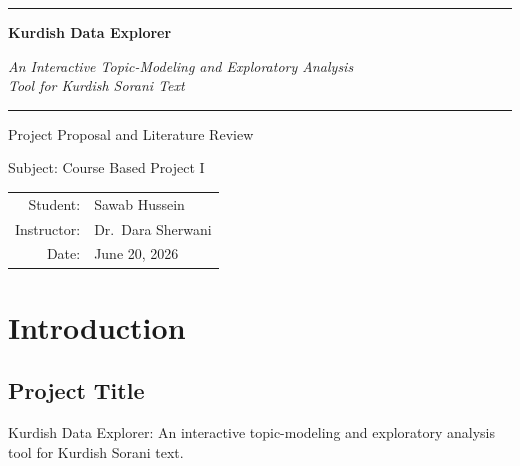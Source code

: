 \documentclass[12pt,a4paper]{article}
\begin{document}
\thispagestyle{empty}
\begingroup
\centering
{}

{\color{Accent}\rule{0.55\textwidth}{0.7pt}}\par
\vspace{1.1em}
{\fontsize{30}{36}\selectfont\bfseries\color{MainText} Kurdish Data Explorer\par}
\vspace{0.9em}
{\large\itshape\color{SecondaryText} An Interactive Topic-Modeling and Exploratory Analysis\\ Tool for Kurdish Sorani Text\par}
\vspace{1.1em}
{\color{Accent}\rule{0.55\textwidth}{0.7pt}}\par


{\large\color{SecondaryText} Project Proposal and Literature Review\par}
\vspace{0.4em}
{\color{SecondaryText} Subject: Course Based Project I\par}


{\color{MainText}\begin{tabular}{r@{\hskip 0.6em}l}
  {\color{SecondaryText}Student:} & Sawab Hussein \\[0.35em]
  {\color{SecondaryText}Instructor:} & Dr.\ Dara Sherwani \\[0.35em]
  {\color{SecondaryText}Date:} & June 20, 2026 \\
\end{tabular}\par}

\endgroup
\clearpage

\thispagestyle{empty}
\tableofcontents
\clearpage

\section{Introduction}

\subsection{Project Title}
Kurdish Data Explorer: An interactive topic-modeling and exploratory analysis tool for Kurdish Sorani text.
\end{document}
